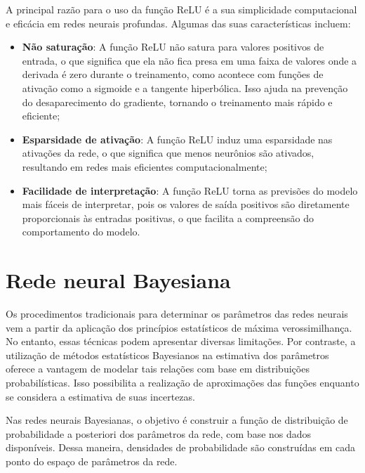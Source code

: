 A principal razão para o uso da função ReLU é a sua simplicidade computacional e eficácia em redes neurais profundas. Algumas das suas características incluem:

\begin{itemize}
    \item \textbf{Não saturação}:
    A função ReLU não satura para valores positivos de entrada, o que significa que ela não fica presa em uma faixa de valores onde a derivada é zero durante o treinamento, como acontece com funções de ativação como a sigmoide e a tangente hiperbólica. Isso ajuda na prevenção do desaparecimento do gradiente, tornando o treinamento mais rápido e eficiente;
    
    \item \textbf{Esparsidade de ativação}:
    A função ReLU induz uma esparsidade nas ativações da rede, o que significa que menos neurônios são ativados, resultando em redes mais eficientes computacionalmente;
    
    \item \textbf{Facilidade de interpretação}:
    A função ReLU torna as previsões do modelo mais fáceis de interpretar, pois os valores de saída positivos são diretamente proporcionais às entradas positivas, o que facilita a compreensão do comportamento do modelo.
\end{itemize}

\section{Rede neural Bayesiana}

Os procedimentos tradicionais para determinar os parâmetros das redes neurais vem a partir da aplicação dos princípios estatísticos de máxima verossimilhança. No entanto, essas técnicas podem apresentar diversas limitações. Por contraste, a utilização de métodos estatísticos Bayesianos na estimativa dos parâmetros oferece a vantagem de modelar tais relações com base em distribuições probabilísticas. Isso possibilita a realização de aproximações das funções enquanto se considera a estimativa de suas incertezas.\cite{rodriguezrede}

Nas redes neurais Bayesianas, o objetivo é construir a função de distribuição de
probabilidade a posteriori dos parâmetros da rede, com base nos dados disponíveis.
Dessa maneira, densidades de probabilidade são construídas em cada ponto do espaço
de parâmetros da rede.\cite{rodriguezrede}

